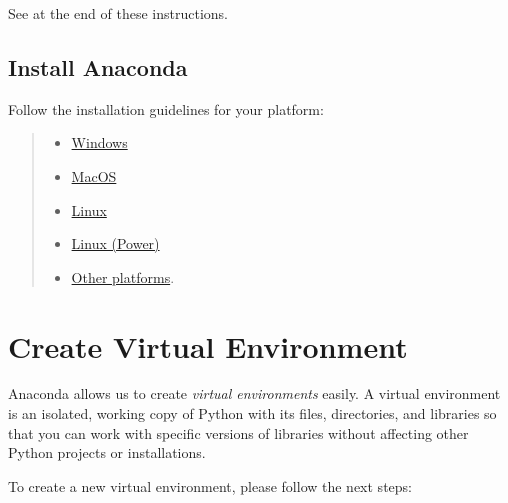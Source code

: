 \documentclass{latex-template/tufte-handout}
\begin{document}
See  at the end of these instructions.

\subsection{Install Anaconda}\label{install-anaconda}

Follow the installation guidelines for your platform:

\begin{quote}
\begin{itemize}
\item \href{https://docs.anaconda.com/anaconda/install/windows/}{Windows}\\
\item \href{https://docs.anaconda.com/anaconda/install/mac-os/}{MacOS}
\item \href{https://docs.anaconda.com/anaconda/install/linux/}{Linux}\\
\item \href{https://docs.anaconda.com/anaconda/install/linux-power8/}{Linux (Power)}
\item \href{https://docs.anaconda.com/anaconda/install/}{Other platforms}.
\end{itemize}
\end{quote}


\section{Create Virtual Environment}
Anaconda allows us to create \emph{virtual environments} easily.
A virtual environment is an isolated, working copy of Python with its files, directories, and libraries so that you can work with specific versions of libraries without affecting other Python projects or installations.

To create a new virtual environment, please follow the next steps:
\end{document}
